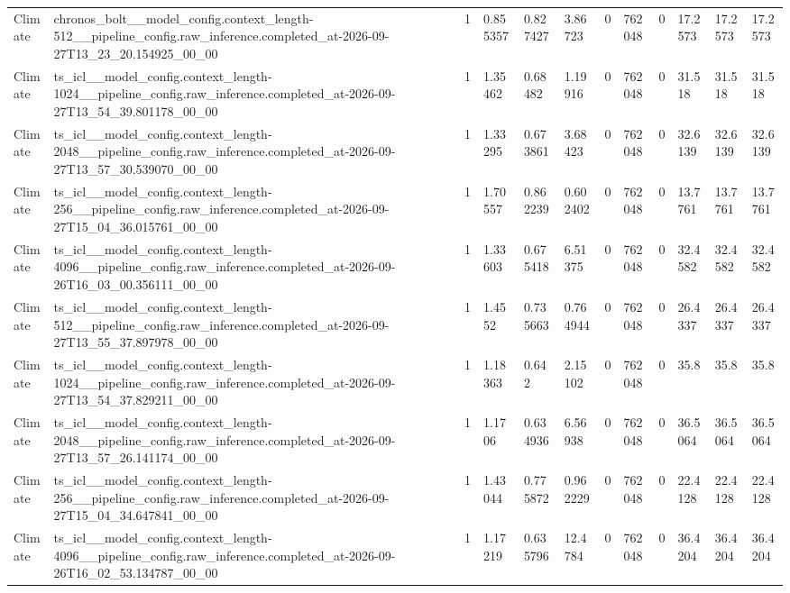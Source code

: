 \begin{tabular}{llllllllllll}
Climate & chronos\_bolt\_\_model\_config.context\_length-512\_\_pipeline\_config.raw\_inference.completed\_at-2026-09-27T13\_23\_20.154925\_00\_00 & 1 & 0.855357 & 0.827427 & 3.86723 & 0 & 762048 & 0 & 17.2573 & 17.2573 & 17.2573 \\
Climate & ts\_icl\_\_model\_config.context\_length-1024\_\_pipeline\_config.raw\_inference.completed\_at-2026-09-27T13\_54\_39.801178\_00\_00 & 1 & 1.35462 & 0.68482 & 1.19916 & 0 & 762048 & 0 & 31.518 & 31.518 & 31.518 \\
Climate & ts\_icl\_\_model\_config.context\_length-2048\_\_pipeline\_config.raw\_inference.completed\_at-2026-09-27T13\_57\_30.539070\_00\_00 & 1 & 1.33295 & 0.673861 & 3.68423 & 0 & 762048 & 0 & 32.6139 & 32.6139 & 32.6139 \\
Climate & ts\_icl\_\_model\_config.context\_length-256\_\_pipeline\_config.raw\_inference.completed\_at-2026-09-27T15\_04\_36.015761\_00\_00 & 1 & 1.70557 & 0.862239 & 0.602402 & 0 & 762048 & 0 & 13.7761 & 13.7761 & 13.7761 \\
Climate & ts\_icl\_\_model\_config.context\_length-4096\_\_pipeline\_config.raw\_inference.completed\_at-2026-09-26T16\_03\_00.356111\_00\_00 & 1 & 1.33603 & 0.675418 & 6.51375 & 0 & 762048 & 0 & 32.4582 & 32.4582 & 32.4582 \\
Climate & ts\_icl\_\_model\_config.context\_length-512\_\_pipeline\_config.raw\_inference.completed\_at-2026-09-27T13\_55\_37.897978\_00\_00 & 1 & 1.4552 & 0.735663 & 0.764944 & 0 & 762048 & 0 & 26.4337 & 26.4337 & 26.4337 \\
Climate & ts\_icl\_\_model\_config.context\_length-1024\_\_pipeline\_config.raw\_inference.completed\_at-2026-09-27T13\_54\_37.829211\_00\_00 & 1 & 1.18363 & 0.642 & 2.15102 & 0 & 762048 & 0 & 35.8 & 35.8 & 35.8 \\
Climate & ts\_icl\_\_model\_config.context\_length-2048\_\_pipeline\_config.raw\_inference.completed\_at-2026-09-27T13\_57\_26.141174\_00\_00 & 1 & 1.1706 & 0.634936 & 6.56938 & 0 & 762048 & 0 & 36.5064 & 36.5064 & 36.5064 \\
Climate & ts\_icl\_\_model\_config.context\_length-256\_\_pipeline\_config.raw\_inference.completed\_at-2026-09-27T15\_04\_34.647841\_00\_00 & 1 & 1.43044 & 0.775872 & 0.962229 & 0 & 762048 & 0 & 22.4128 & 22.4128 & 22.4128 \\
Climate & ts\_icl\_\_model\_config.context\_length-4096\_\_pipeline\_config.raw\_inference.completed\_at-2026-09-26T16\_02\_53.134787\_00\_00 & 1 & 1.17219 & 0.635796 & 12.4784 & 0 & 762048 & 0 & 36.4204 & 36.4204 & 36.4204 \\

\end{tabular}
